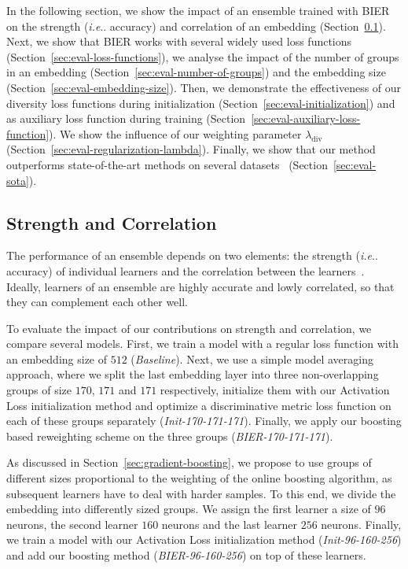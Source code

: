 \documentclass[10pt,journal,compsoc]{IEEEtran}
\makeatletter
\DeclareRobustCommand\onedot{\futurelet\@let@token\@onedot}
\def\@onedot{\ifx\@let@token.\else.\null\fi\xspace}
\def\ie{\emph{i.e}\onedot} \def\Ie{\emph{I.e}\onedot}
\makeatother
\begin{document}
In the following section, we show the impact of an ensemble trained with \ac{BIER} on the strength (\ie accuracy)
and correlation of an embedding (Section~\ref{sec:eval:strength-and-correlation}). Next, we show that \ac{BIER} works with several widely used loss functions (Section~\ref{sec:eval-loss-functions}),
we analyse the impact of the number of groups in an embedding (Section~\ref{sec:eval-number-of-groups}) and the embedding size (Section~\ref{sec:eval-embedding-size}).
Then, we demonstrate the effectiveness of our diversity loss functions during initialization (Section~\ref{sec:eval-initialization}) and as 
auxiliary loss function during training (Section~\ref{sec:eval-auxiliary-loss-function}). We show the influence of our weighting parameter $\lambda_\text{div}$ (Section~\ref{sec:eval-regularization-lambda}). 
Finally, we show that our method
outperforms state-of-the-art methods on several 
datasets~\cite{krause20133d,liu2016deep,liu2016deepfashion,oh2016deep,WahCUB_200_2011} (Section~\ref{sec:eval-sota}).

\subsection{Strength and Correlation}\label{sec:eval:strength-and-correlation}

The performance of an ensemble depends on two elements: the strength (\ie accuracy) of 
individual learners and the correlation between the learners~\cite{breiman2001random}. 
Ideally, learners of an ensemble are highly accurate and lowly correlated, 
so that they can complement each other well.

To evaluate the impact of our contributions on strength and correlation, we compare 
several models. First, we train a model with
a regular loss function with an embedding size of $512$ (\emph{Baseline}).  Next, we use a simple model averaging approach, where we
split the last embedding layer into three non-overlapping groups of size $170$,
$171$ and $171$ respectively, initialize them with our Activation Loss initialization method and optimize 
a discriminative metric loss function on each of these
groups separately (\emph{Init-170-171-171}). 
Finally, we apply our boosting based
reweighting scheme on the three groups (\emph{BIER-170-171-171}).  

As discussed in Section~\ref{sec:gradient-boosting}, we propose to use groups of 
different sizes proportional to the weighting of the online boosting algorithm, as subsequent learners have to deal with harder samples. To this end, we divide the embedding 
into differently sized groups. We assign
the first learner a size of $96$ neurons, the second learner $160$ neurons and the last 
learner $256$ neurons. Finally, we train a model with our Activation Loss initialization method (\emph{Init-96-160-256}) and 
add our boosting method (\emph{BIER-96-160-256}) on top of these learners.
\end{document}
